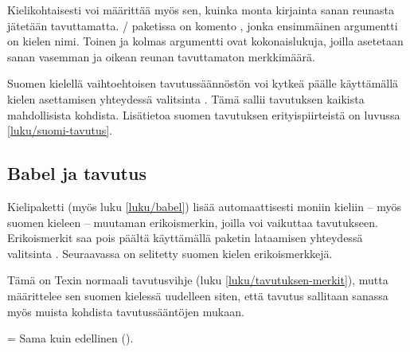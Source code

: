 \begin{koodilohkosis}
\end{koodilohkosis}

\noindent
Kielikohtaisesti voi määrittää myös sen, kuinka monta kirjainta sanan
reunasta jätetään tavuttamatta. \-/ paketissa on
komento , jonka ensimmäinen argumentti on
kielen nimi. Toinen ja kolmas argumentti ovat kokonaislukuja, joilla
asetetaan sanan vasemman ja oikean reunan tavuttamaton merkkimäärä.

\begin{koodilohkosis}
\end{koodilohkosis}

\noindent
Suomen kielellä vaihtoehtoisen tavutussäännöstön voi kytkeä päälle
käyttämällä kielen asettamisen yhteydessä valitsinta
. Tämä sallii tavutuksen kaikista mahdollisista
kohdista. Lisätietoa suomen tavutuksen erityispiirteistä on luvussa
\ref{luku/suomi-tavutus}.

\begin{koodilohkosis}
\setdefaultlanguage[schoolhyphens]{finnish}
\end{koodilohkosis}

\subsection{Babel ja tavutus}
\label{luku/tavutus-babel}

Kielipaketti \yipilkku{} (myös
luku \ref{luku/babel}) lisää automaattisesti moniin kieliin -- myös
suomen kieleen -- muutaman erikoismerkin, joilla voi vaikuttaa
tavutukseen. Erikoismerkit saa pois päältä käyttämällä paketin
lataamisen yhteydessä valitsinta .
Seuraavassa on selitetty suomen kielen erikoismerkkejä.

\begin{maaritelma}{}
\item [\komento{-}] Tämä on Texin normaali tavutusvihje (luku
  \ref{luku/tavutuksen-merkit}), mutta  määrittelee sen
  suomen kielessä uudelleen siten, että tavutus sallitaan sanassa myös
  muista kohdista tavutussääntöjen mukaan.

  \shorthandsyhdysmerkki

\item [\textquotedbl=] Sama kuin edellinen (\koodi{\textquotedbl-}).

  \shorthandspystyviiva

  \shorthandslainausmerkki

\end{maaritelma}


